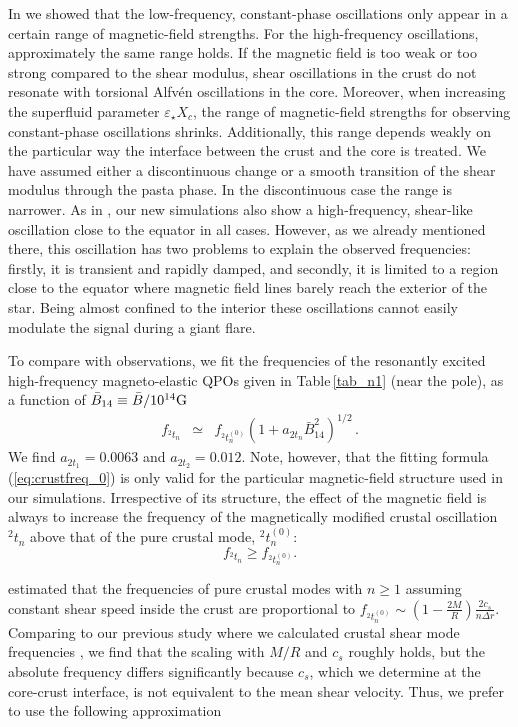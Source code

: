 \documentclass[useAMS,usenatbib]{mnras}
\begin{document}
In \cite{Gabler2016} we showed that the low-frequency, constant-phase 
oscillations only appear in a certain range of magnetic-field strengths. For the 
high-frequency oscillations, approximately the same range holds. If the magnetic 
field is too weak or too strong compared to the shear modulus, shear 
oscillations in the crust do not resonate with torsional Alfv\'en oscillations 
in the core.  Moreover, when increasing the superfluid parameter 
$\varepsilon_\star X_c$, the range of magnetic-field strengths for observing 
constant-phase oscillations shrinks. Additionally, this range depends weakly on 
the particular way the interface between the crust and the core is treated. We 
have assumed either a discontinuous change or a smooth transition of the shear 
modulus through the pasta phase. In the discontinuous case the range is 
narrower. As in \cite{Gabler2013b}, our new simulations also show a 
high-frequency, shear-like oscillation close to the equator in all cases. 
However, as we already mentioned there, this oscillation has two problems to 
explain the observed frequencies: firstly, it is transient and rapidly damped, 
and secondly, it is limited to a region close to the equator where magnetic 
field lines barely reach the exterior of the star. Being almost confined to the 
interior these oscillations cannot easily modulate the signal during a giant 
flare. 

To compare with observations, we fit the frequencies of the resonantly excited 
high-frequency magneto-elastic QPOs given in Table\,\ref{tab_n1} (near the 
pole), as a function of $\bar B_{14}\equiv\bar B /10^{14}{\rm G}$
%
\begin{eqnarray}
 f_{^2t_n}&\simeq&f_{^2t^{(0)}_n} \left(1+a_{2t_n} 
\bar 
B^2_{14}\right)^{1/2}\,\label{eq:crustfreq_0}.
\end{eqnarray}
%
We find $a_{2t_1}=0.0063$  and $a_{2t_2}=0.012$. Note, however, 
that the fitting formula (\ref{eq:crustfreq_0}) is only valid for the 
particular magnetic-field structure used in our simulations. Irrespective of its 
structure, the effect of the magnetic field is always to increase the frequency 
of the magnetically modified crustal oscillation $^2t_n$ above that of the pure 
crustal mode, ${^2t^{(0)}_n}$:
%
\begin{equation}
 f_{^2t_n} \ge f_{^2t^{(0)}_n}.\label{eq:crustfreq_1}
\end{equation}
%
        
\cite{Samuelsson2007} estimated that the frequencies of pure crustal modes 
with $n\ge1$ assuming constant shear speed inside the crust are proportional to 
$f_{^2t^{(0)}_n}\sim \left(1-\frac{2M}{R}\right)\frac{2 c_s}{n\Delta 
r}$. Comparing to our previous study where we calculated crustal shear mode 
frequencies \citep{Gabler2012}, we find that the scaling with $M/R$ and $c_s$ 
roughly holds, but the absolute frequency differs significantly because 
$c_s$, which we determine at the core-crust interface, is not equivalent to the 
mean shear velocity. Thus, we prefer to use the following approximation
\end{document}

